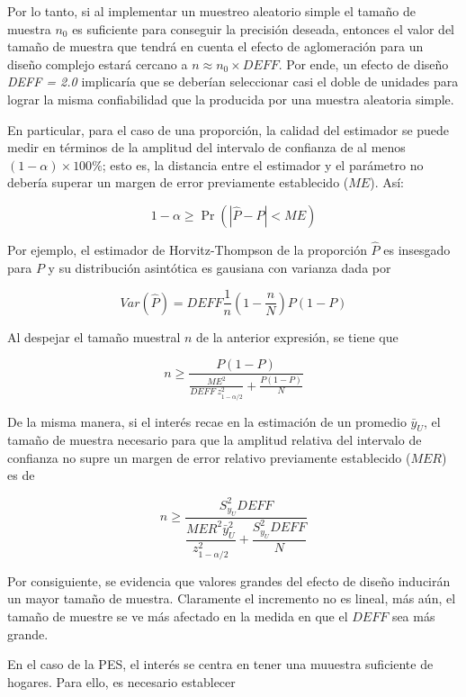 \documentclass[
  12pt,
]{book}
\begin{document}
Por lo tanto, si al implementar un muestreo aleatorio simple el tamaño de muestra \(n_0\) es suficiente para conseguir la precisión deseada, entonces el valor del tamaño de muestra que tendrá en cuenta el efecto de aglomeración para un diseño complejo estará cercano a \(n \approx  n_0 \times DEFF\). Por ende, un efecto de diseño \emph{DEFF = 2.0} implicaría que se deberían seleccionar casi el doble de unidades para lograr la misma confiabilidad que la producida por una muestra aleatoria simple.

En particular, para el caso de una proporción, la calidad del estimador se puede medir en términos de la amplitud del intervalo de confianza de al menos \((1-\alpha) \times 100\%\); esto es, la distancia entre el estimador y el parámetro no debería superar un margen de error previamente establecido (\(ME\)). Así:

\[
1-\alpha \geq \Pr\left(|\hat{P}-P|<ME\right)
\]

Por ejemplo, el estimador de Horvitz-Thompson de la proporción \(\hat{P}\) es insesgado para \(P\) y su distribución asintótica es gausiana con varianza dada por

\[
Var\left(\hat{P}\right)=DEFF\frac{1}{n}(1-\frac{n}{N})P(1-P)
\]

Al despejar el tamaño muestral \(n\) de la anterior expresión, se tiene que

\[
n\geq\frac{P(1-P)}{\frac{ME^2}{DEFF \ z_{1-\alpha/2}^2}+\frac{P(1-P)}{N}}
\]

De la misma manera, si el interés recae en la estimación de un promedio \(\bar{y}_U\), el tamaño de muestra necesario para que la amplitud relativa del intervalo de confianza no supre un margen de error relativo previamente establecido (\(MER\)) es de

\[
n \geq \dfrac{S^2_{y_U}DEFF}{\dfrac{MER^2 \bar{y}_U^2}{z_{1-\alpha/2}^2}+\dfrac{S^2_{y_U}DEFF}{N}}
\]

Por consiguiente, se evidencia que valores grandes del efecto de diseño inducirán un mayor tamaño de muestra. Claramente el incremento no es lineal, más aún, el tamaño de muestre se ve más afectado en la medida en que el \(DEFF\) sea más grande.

En el caso de la PES, el interés se centra en tener una muuestra suficiente de hogares. Para ello, es necesario establecer
\end{document}
